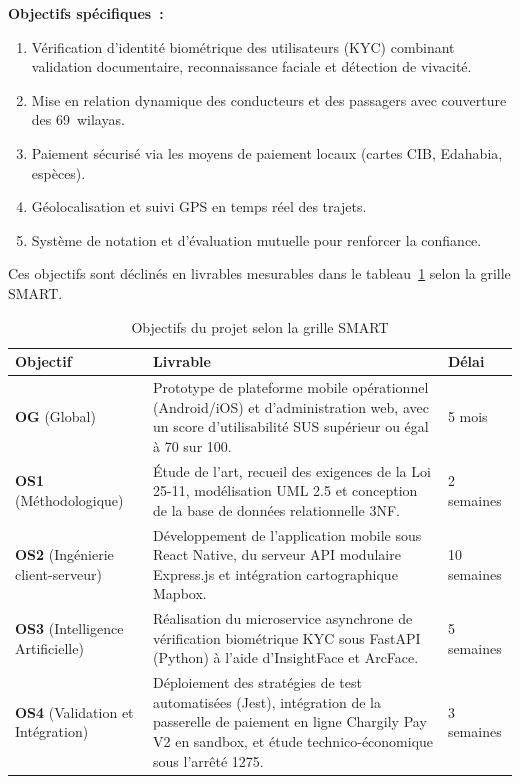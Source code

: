 \medskip
\textbf{Objectifs spécifiques~:}
\begin{enumerate}
  \item Vérification d'identité biométrique des utilisateurs (KYC) combinant validation documentaire, reconnaissance faciale et détection de vivacité.
  \item Mise en relation dynamique des conducteurs et des passagers avec couverture des 69~wilayas.
  \item Paiement sécurisé via les moyens de paiement locaux (cartes CIB, Edahabia, espèces).
  \item Géolocalisation et suivi GPS en temps réel des trajets.
  \item Système de notation et d'évaluation mutuelle pour renforcer la confiance.
\end{enumerate}

\medskip
Ces objectifs sont déclinés en livrables mesurables dans le tableau~\ref{tab:objectifs_smart} selon la grille SMART.

\begin{table}[!htbp]
\centering
\small
\begin{tabularx}{\textwidth}{|l|X|l|}
\hline
\rowcolor{rohlight}
\textbf{Objectif} & \textbf{Livrable} & \textbf{Délai} \\
\hline
\textbf{OG} (Global) & Prototype de plateforme mobile opérationnel (Android/iOS) et d'administration web, avec un score d'utilisabilité SUS supérieur ou égal à 70 sur 100. & 5 mois \\
\hline
\textbf{OS1} (Méthodologique) & Étude de l'art, recueil des exigences de la Loi 25-11, modélisation UML 2.5 et conception de la base de données relationnelle 3NF. & 2 semaines \\
\hline
\textbf{OS2} (Ingénierie client-serveur) & Développement de l'application mobile sous React Native, du serveur API modulaire Express.js et intégration cartographique Mapbox. & 10 semaines \\
\hline
\textbf{OS3} (Intelligence Artificielle) & Réalisation du microservice asynchrone de vérification biométrique KYC sous FastAPI (Python) à l'aide d'InsightFace et ArcFace. & 5 semaines \\
\hline
\textbf{OS4} (Validation et Intégration) & Déploiement des stratégies de test automatisées (Jest), intégration de la passerelle de paiement en ligne Chargily Pay V2 en sandbox, et étude technico-économique sous l'arrêté 1275. & 3 semaines \\
\hline
\end{tabularx}
\caption{Objectifs du projet selon la grille SMART}
\label{tab:objectifs_smart}
\end{table}

